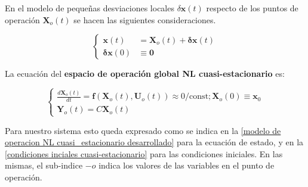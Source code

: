 \documentclass[a4paper, 10pt, onecolumn,journal]{ieeeconf}
\begin{document}
En el modelo de pequeñas desviaciones locales $\delta \mathbf{x}(t)$ respecto de los puntos de operación $\mathbf{X}_o(t)$
se hacen las siguientes consideraciones.

\begin{equation}
    \begin{cases}
    \mathbf{x}(t)  &= \mathbf{X}_o(t) + \mathbf{\delta x}(t)\\
    \mathbf{\delta x}(0) &\equiv \mathbf{0}
    \end{cases}
    \label{pequeñas desviaciones}
\end{equation}

La ecuación del \textbf{espacio de operación global NL cuasi-estacionario} es:

\begin{equation}
    \begin{cases}
    \frac{d\mathbf{X}_o(t)}{dt} =  \mathbf{f}(\mathbf{X}_o(t), \mathbf{U}_o(t)) \approx 0/\text{const};  \mathbf{X}_o(0) \equiv \mathbf{x}_0\\
    \mathbf{Y}_o(t) = C \mathbf{X}_o(t)
    \end{cases}
    \label{modelo de operacion NL cuasi-estacionario}
\end{equation}

Para nuestro sistema esto queda expresado como se indica en la \cref{modelo de operacion NL cuasi_estacionario desarrollado} para la ecuación de estado, y en la \cref{condiciones inciales cuasi-estacionario} para las condiciones iniciales.
En las mismas, el sub-indice $-o$ indica los valores de las variables en el punto de operación.
\end{document}
